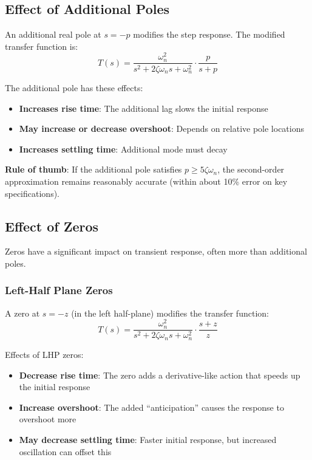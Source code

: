 \subsection{Effect of Additional Poles}

An additional real pole at $s = -p$ modifies the step response. The modified transfer function is:
\begin{equation}
    T(s) = \frac{\omega_n^2}{s^2 + 2\zeta\omega_n s + \omega_n^2} \cdot \frac{p}{s + p}
\end{equation}

The additional pole has these effects:
\begin{itemize}
    \item \textbf{Increases rise time}: The additional lag slows the initial response
    \item \textbf{May increase or decrease overshoot}: Depends on relative pole locations
    \item \textbf{Increases settling time}: Additional mode must decay
\end{itemize}

\textbf{Rule of thumb}: If the additional pole satisfies $p \geq 5\zeta\omega_n$, the second-order approximation remains reasonably accurate (within about 10\% error on key specifications).

\subsection{Effect of Zeros}

Zeros have a significant impact on transient response, often more than additional poles.

\subsubsection{Left-Half Plane Zeros}

A zero at $s = -z$ (in the left half-plane) modifies the transfer function:
\begin{equation}
    T(s) = \frac{\omega_n^2}{s^2 + 2\zeta\omega_n s + \omega_n^2} \cdot \frac{s + z}{z}
\end{equation}

Effects of LHP zeros:
\begin{itemize}
    \item \textbf{Decrease rise time}: The zero adds a derivative-like action that speeds up the initial response
    \item \textbf{Increase overshoot}: The added ``anticipation'' causes the response to overshoot more
    \item \textbf{May decrease settling time}: Faster initial response, but increased oscillation can offset this
\end{itemize}

